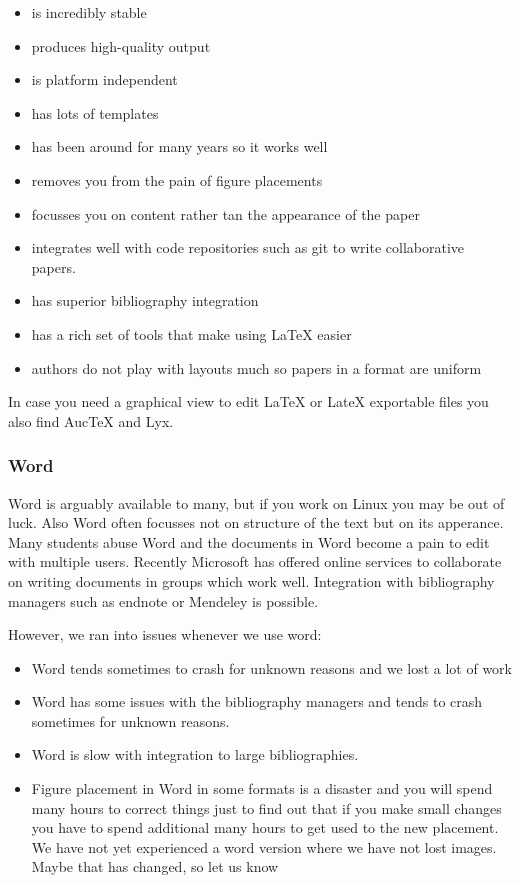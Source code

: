 \begin{itemize}
\tightlist
\item
  is incredibly stable
\item
  produces high-quality output
\item
  is platform independent
\item
  has lots of templates
\item
  has been around for many years so it works well
\item
  removes you from the pain of figure placements
\item
  focusses you on content rather tan the appearance of the paper
\item
  integrates well with code repositories such as git to write
  collaborative papers.
\item
  has superior bibliography integration
\item
  has a rich set of tools that make using LaTeX easier
\item
  authors do not play with layouts much so papers in a format are
  uniform
\end{itemize}

In case you need a graphical view to edit LaTeX or LateX exportable
files you also find AucTeX and Lyx.

\subsubsection{Word}\label{word}

Word is arguably available to many, but if you work on Linux you may be
out of luck. Also Word often focusses not on structure of the text but
on its apperance. Many students abuse Word and the documents in Word
become a pain to edit with multiple users. Recently Microsoft has
offered online services to collaborate on writing documents in groups
which work well. Integration with bibliography managers such as endnote
or Mendeley is possible.

However, we ran into issues whenever we use word:

\begin{itemize}
\tightlist
\item
  Word tends sometimes to crash for unknown reasons and we lost a lot of
  work
\item
  Word has some issues with the bibliography managers and tends to crash
  sometimes for unknown reasons.
\item
  Word is slow with integration to large bibliographies.
\item
  Figure placement in Word in some formats is a disaster and you will
  spend many hours to correct things just to find out that if you make
  small changes you have to spend additional many hours to get used to
  the new placement. We have not yet experienced a word version where we
  have not lost images. Maybe that has changed, so let us know
\end{itemize}

